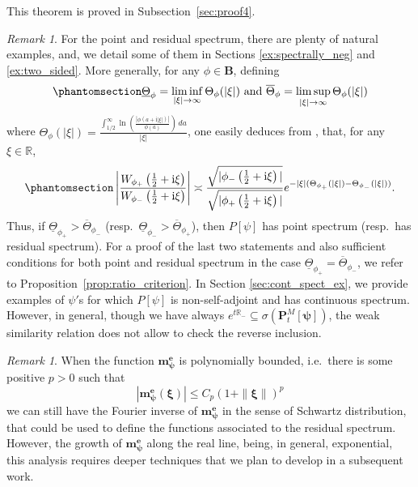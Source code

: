 \documentclass[12pt]{amsart}
\newcommand{\hlabel}{\phantomsection\label}
\numberwithin{equation}{section}
\newcommand{\bb}{\mathbb}
\renewcommand{\le}{\leqslant}
\newcommand{\ov}{\overline}
\newcommand{\Mpsi}{\mm^{\mathbf e}_{{\bm{\psi}}}}
\newcommand{\B}{\mathbf{B}}
\renewcommand{\i}{\mathrm{i}}
\newcommand{\mm}{\mathbf{m}}
\theoremstyle{definition}
\theoremstyle{assump}
\theoremstyle{remark}
\newtheorem{rem}[thm]{Remark}
\begin{document}
This theorem is proved in Subsection~\ref{sec:proof4}.
\begin{rem}
 For the point and residual spectrum, there are plenty of natural examples, and,  we detail some of them in Sections \ref{ex:spectrally_neg} and \ref{ex:two_sided}. More generally, for any $\phi\in\B$, defining
\begin{align}\hlabel{eq:Thetas}
 \underline{\Theta}_\phi=\liminf_{|\xi|\to\infty}\Theta_\phi(|\xi|) \mbox{ and } \ov{\Theta}_\phi=\limsup_{|\xi|\to\infty}\Theta_\phi(|\xi|)
\end{align}
where $\Theta_\phi(|\xi|)=\frac{\int_{1/2}^\infty\ln\left(\frac{|\phi(a+\i|\xi|)|}{\phi(a)}\right)\,da}{|\xi|}$, one easily deduces from \cite[Theorem 6.2(1)]{patiesavov}, that,  for any $\xi \in \bb{R}$,
\begin{equation}\hlabel{eq:ration-gene}
		\left|\frac{W_{\phi_+}\left(\frac{1}{2}+{\rm{i}}\xi\right)   }{W_{\phi_-}\left(\frac{1}{2}+{\rm{i}}\xi\right)   }\right|\asymp\frac{\sqrt{|\phi_-\left(\frac{1}{2}+{\rm{i}}\xi\right) |}}{\sqrt{|\phi_+\left(\frac{1}{2}+{\rm{i}}\xi\right)   |}}e^{-|\xi|(\Theta_{\phi_+}(|\xi|)-\Theta_{\phi_-}(|\xi|))}.
	\end{equation} %
Thus, if $\underline{\Theta}_{\phi_+}>\ov{\Theta}_{\phi_-}$ (resp.~$\underline{\Theta}_{\phi_-}>\ov{\Theta}_{\phi_+}$), then ${P}[\psi]$ has point spectrum (resp.~has residual spectrum). For a proof of the last two statements and also sufficient conditions for both point and residual spectrum  in the case $\underline{\Theta}_{\phi_+}=\ov{\Theta}_{\phi_-}$, we refer to Proposition~\ref{prop:ratio_criterion}. In Section \ref{sec:cont_spect_ex}, we  provide examples of $\psi'$s for which ${P}[\psi]$ is non-self-adjoint and has continuous spectrum. However, in general, though we have always $e^{t\bb{R}_-}\subseteq\sigma(\bm{P}^M_t[\bm{\psi}])$, the weak similarity relation does not allow to check the reverse inclusion.
\end{rem}
\begin{rem}
 When the function $\Mpsi$ is polynomially bounded, i.e.~there is some positive $p>0$ such that \[\left|\Mpsi(\bm \xi)\right|\le C_p(1+\|\bm{\xi}\|)^p\] we can still have the Fourier inverse of $\Mpsi$ in the sense of Schwartz distribution, that could be used to define the functions associated to the residual spectrum. However, the growth of $\Mpsi$ along the real line,  being, in general,  exponential, this analysis requires deeper techniques  that we plan to develop in a subsequent work.
\end{rem}
\end{document}
